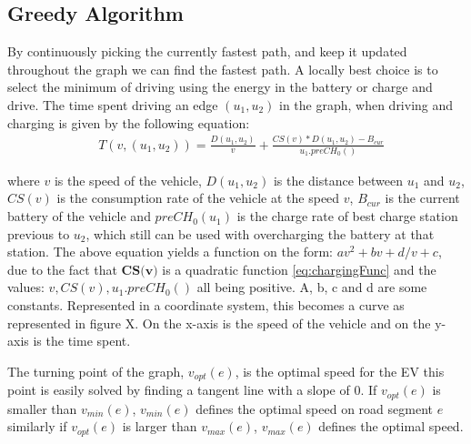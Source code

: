 \subsection{Greedy Algorithm}
By continuously picking the currently fastest path, and keep it updated throughout the graph we can find the fastest path. A locally best choice is to select the minimum of driving using the energy in the battery or charge and drive.
The time spent driving an edge $(u_1, u_2)$ in the graph, when driving and charging is given by the following equation:
\begin{equation}
\begin{aligned}
 & T(v,(u_1, u_2)) = \frac{D(u_1, u_2)}{v} + \frac{CS(v) * D(u_1, u_2) - B_{cur}}{u_1.preCH_0()}
\end{aligned}
\end{equation}\label{eq:drivingAndCharging}




where $v$ is the speed of the vehicle, $D(u_1, u_2)$ is the distance between $u_1$ and $u_2$,
$CS(v)$ is the consumption rate of the vehicle at the speed $v$, $B_{cur}$ is the current battery of the vehicle and $preCH_0(u_1)$ is the charge rate of best charge station previous to $u_2$, which still can be used with overcharging the battery at that station. The above equation yields a function on the form: $av^2 + bv + d/v + c$, due to the fact that $\textbf{CS(v)}$ is a quadratic function \ref{eq:chargingFunc} and the values: $v, CS(v), u_1.preCH_0()$ all being positive.
A, b, c and d are some constants. Represented in a coordinate system, this becomes a curve as represented in figure X. On the x-axis is the speed of the vehicle and on the y-axis is the time spent.

The turning point of the graph, $v_{opt}(e)$, is the optimal speed for the EV this point is easily solved by finding a tangent line with a slope of 0. If $v_{opt}(e)$ is smaller than $v_{min}(e)$, $v_{min}(e)$ defines the optimal speed on road segment $e$ similarly if $v_{opt}(e)$ is larger than $v_{max}(e)$, $v_{max}(e)$ defines the optimal speed.  

